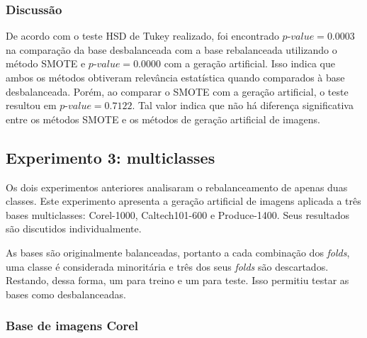 \subsubsection*{Discussão}

De acordo com o teste HSD de Tukey realizado, foi encontrado $\textit{p-value} = 0.0003$ na comparação da base desbalanceada com a base rebalanceada utilizando o método SMOTE e $\textit{p-value} = 0.0000$ com a geração artificial. Isso indica que ambos os métodos obtiveram relevância estatística quando comparados à base desbalanceada. Porém, ao comparar o SMOTE com a geração artificial, o teste resultou em $\textit{p-value} = 0.7122$. Tal valor indica que não há diferença significativa entre os métodos SMOTE e os métodos de geração artificial de imagens.

\subsection{Experimento 3: multiclasses}

Os dois experimentos anteriores analisaram o rebalanceamento de apenas duas classes. Este experimento apresenta a geração artificial de imagens aplicada a três bases multiclasses: Corel-1000, Caltech101-600 e Produce-1400. Seus resultados são discutidos individualmente.

As bases são originalmente balanceadas, portanto a cada combinação dos \textit{folds}, uma classe é considerada minoritária e três dos seus \textit{folds} são descartados. Restando, dessa forma, um para treino e um para teste. Isso permitiu testar as bases como desbalanceadas.

\subsubsection{Base de imagens Corel}


